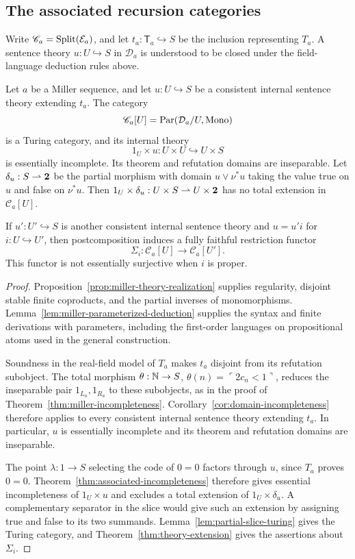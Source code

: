 \subsection{The associated recursion categories}

Write $\mathscr C_a=\operatorname{Split}(\mathcal E_a)$, and let
$t_a:\mathsf T_a\hookrightarrow S$ be the inclusion representing $T_a$. A sentence theory $u:U\hookrightarrow S$ in
$\mathcal D_a$ is understood to be closed under the field-language
deduction rules above.

\begin{corollary}\label{cor:miller-associated-categories}
Let $a$ be a Miller sequence, and let $u:U\hookrightarrow S$ be a
consistent internal sentence theory extending $t_a$. The category
\[
 \mathscr C_a[U]=\operatorname{Par}(\mathcal D_a/U,\operatorname{Mono})
\]
is a Turing category, and its internal theory
\[
 1_U\times u:U\times U\hookrightarrow U\times S
\]
is essentially incomplete. Its theorem and refutation domains are
inseparable. Let $\delta_u:S\rightharpoonup\mathbf 2$ be the partial
morphism with domain $u\vee\nu^*u$ taking the value true on $u$
and false on $\nu^*u$. Then
$1_U\times\delta_u:U\times S\rightharpoonup U\times\mathbf 2$
has no total extension in $\mathscr C_a[U]$.

If $u':U'\hookrightarrow S$ is another consistent internal
sentence theory and $u=u'i$ for $i:U\hookrightarrow U'$, then
postcomposition induces a fully faithful restriction functor
\[
 \Sigma_i:\mathscr C_a[U]\longrightarrow\mathscr C_a[U'].
\]
This functor is not essentially surjective when $i$ is proper.
\end{corollary}
\begin{proof}
Proposition~\ref{prop:miller-theory-realization} supplies regularity,
disjoint stable finite coproducts, and the partial inverses of
monomorphisms. Lemma~\ref{lem:miller-parameterized-deduction}
supplies the syntax and finite derivations with parameters,
including the first-order languages on propositional atoms used in
the general construction.

Soundness in the real-field model of $T_a$ makes $t_a$ disjoint
from its refutation subobject. The total morphism
$\theta:\mathbb N\to S$, $\theta(n)=\ulcorner 2c_n<1\urcorner$,
reduces the inseparable pair
$1_{L_a},1_{R_a}$ to these subobjects, as in the proof of
Theorem~\ref{thm:miller-incompleteness}.
Corollary~\ref{cor:domain-incompleteness} therefore applies to
every consistent internal sentence theory extending $t_a$.
In particular, $u$ is essentially incomplete and its theorem and
refutation domains are inseparable.

The point $\lambda:1\to S$ selecting the code of $0=0$ factors through
$u$, since $T_a$ proves $0=0$. Theorem~\ref{thm:associated-incompleteness}
therefore gives essential incompleteness of $1_U\times u$ and excludes
a total extension of $1_U\times\delta_u$. A complementary separator in
the slice would give such an extension by assigning true and false to its
two summands. Lemma~\ref{lem:partial-slice-turing} gives the Turing
category, and Theorem~\ref{thm:theory-extension} gives the assertions
about $\Sigma_i$.
\end{proof}

